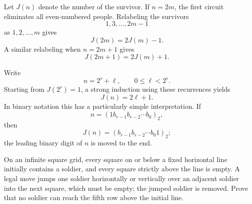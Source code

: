     \begin{solution}
        Let $J(n)$ denote the number of the survivor. If $n=2m$, the first
        circuit eliminates all even-numbered people. Relabeling the survivors
        \[
            1,3,\ldots,2m-1
        \]
        as $1,2,\ldots,m$ gives
        \[
            J(2m)=2J(m)-1.
        \]
        A similar relabeling when $n=2m+1$ gives
        \[
            J(2m+1)=2J(m)+1.
        \]

        Write
        \[
            n=2^r+\ell,
            \qquad
            0\leq\ell<2^r.
        \]
        Starting from $J(2^r)=1$, a strong induction using these recurrences
        yields
        \[
            \boxed{J(n)=2\ell+1}.
        \]
        In binary notation this has a particularly simple interpretation. If
        \[
            n=(1b_{r-1}b_{r-2}\cdots b_0)_2,
        \]
        then
        \[
            J(n)=(b_{r-1}b_{r-2}\cdots b_0 1)_2;
        \]
        the leading binary digit of $n$ is moved to the end.
    \end{solution}

    \begin{expectedproblem}
        On an infinite square grid, every square on or below a fixed horizontal
        line initially contains a soldier, and every square strictly above the
        line is empty. A legal move jumps one soldier horizontally or
        vertically over an adjacent soldier into the next square, which must be
        empty; the jumped soldier is removed. Prove that no soldier can reach
        the fifth row above the initial line.
    \end{expectedproblem}

